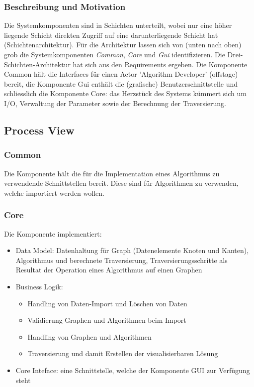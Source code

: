 \subsubsection{Beschreibung und Motivation}
Die Systemkomponenten sind in Schichten unterteilt, wobei nur eine h\"oher liegende Schicht direkten Zugriff auf eine darunterliegende Schicht hat (Schichtenarchitektur). F\"ur die Architektur lassen sich von (unten nach oben) grob die Systemkomponenten \textit{Common}, \textit{Core} und \textit{Gui} identifizieren. Die Drei-Schichten-Architektur hat sich aus den Requirements ergeben. Die Komponente Common h\"alt die Interfaces f\"ur einen Actor 'Algorithm Developer' (offstage) bereit, die Komponente Gui enth\"alt die (grafische) Benutzerschnittstelle und schliesslich die Komponente Core: das Herzst\"uck des Systems k\"ummert sich um I/O, Verwaltung der Parameter sowie der Berechnung der Traversierung.
% 
% 
% 
\subsection{Process View}
% 
\subsubsection{Common}
\label{subsubsec:Common}
Die Komponente h\"alt die f\"ur die Implementation eines Algorithmus zu verwendende Schnittstellen bereit. Diese sind f\"ur Algorithmen zu verwenden, welche importiert werden wollen.
% 
\subsubsection{Core}
\label{subsubsec:Core}
Die Komponente implementiert:
\begin{itemize}
  \item Data Model: Datenhaltung f\"ur Graph (Datenelemente Knoten und Kanten), Algorithmus und berechnete Traversierung, Traversierungsschritte als Resultat der Operation eines Algorithmus auf einen Graphen
  \item Business Logik: 
  \begin{itemize}
      \item Handling von Daten-Import und L\"oschen von Daten
      \item Validierung Graphen und Algorithmen beim Import
      \item Handling von Graphen und Algorithmen
      \item Traversierung und damit Erstellen der visualisierbaren L\"osung
  \end{itemize}
  \item Core Inteface: eine Schnittstelle, welche der Komponente GUI zur Verf\"ugung steht
\end{itemize}
% 
